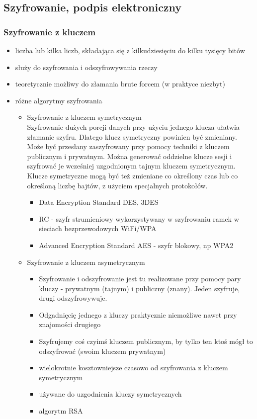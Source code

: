 \documentclass[../main.tex]{subfiles}
\begin{document}
\subsection{Szyfrowanie, podpis elektroniczny}


\subsubsection{Szyfrowanie z kluczem}
\begin{itemize}
    \item liczba lub kilka liczb, składająca się z kilkudziesięciu do kilku tysięcy bitów
    \item służy do szyfrowania i odszyfrowywania rzeczy
    \item teoretycznie możliwy do złamania brute forcem (w praktyce niezbyt)
    \item różne algorytmy szyfrowania
    \begin{itemize}
        \item Szyfrowanie z kluczem symetrycznym\\
        Szyfrowanie dużych porcji danych przy użyciu jednego klucza ułatwia złamanie
        szyfru. Dlatego klucz symetryczny powinien być zmieniany. Może być przesłany zaszyfrowany przy pomocy techniki z kluczem
        publicznym i prywatnym. Można generować oddzielne klucze sesji i szyfrować je
        wcześniej uzgodnionym tajnym kluczem symetrycznym. Klucze symetryczne mogą być też
        zmieniane co określony czas lub co określoną liczbę bajtów, z użyciem specjalnych
        protokołów.
        \begin{itemize}
            \item Data Encryption Standard DES, 3DES
            \item RC - szyfr strumieniowy wykorzystywany w szyfrowaniu ramek w sieciach bezprzewodowych WiFi/WPA
            \item Advanced Encryption Standard AES - szyfr blokowy, np WPA2
        \end{itemize}
        \item Szyfrowanie z kluczem asymetrycznym
        \begin{itemize}
            \item Szyfrowanie i odszyfrowanie jest tu realizowane przy pomocy pary kluczy - prywatnym
            (tajnym) i publiczny (znany). Jeden szyfruje, drugi odszyfrowywuje.
            \item Odgadnięcię jednego z kluczy praktycznie niemożliwe nawet przy znajomości drugiego
            \item Szyfrujemy coś czyimś kluczem publicznym, by tylko ten ktoś mógł to odszyfrować (swoim kluczem prywatnym)
            \item wielokrotnie kosztowniejsze
            czasowo od szyfrowania z kluczem symetrycznym
            \item używane do uzgodnienia kluczy symetrycznych
            \item algorytm RSA
        \end{itemize}
    \end{itemize}

\end{itemize}
\end{document}

